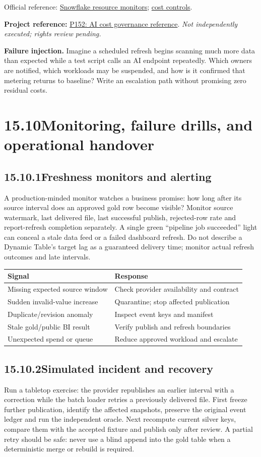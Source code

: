 \documentclass[11pt,twoside]{article}
\newcommand{\topic}[2]{\subsection*{#1\quad #2}}
\newcommand{\repo}[2]{\par\begingroup\fontsize{8.0}{9.6}\selectfont\sffamily\color{inkgray}\textbf{Project reference:} \href{#2}{#1}. \textit{Not independently executed; rights review pending.}\par\endgroup}
\begin{document}
{\fontsize{8}{9.5}\selectfont\color{inkgray}Official reference: \href{https://docs.snowflake.com/en/user-guide/resource-monitors}{Snowflake resource monitors}; \href{https://docs.snowflake.com/en/user-guide/cost-controlling}{cost controls}.}\par
\repo{P152: AI cost governance reference}{https://github.com/sfc-gh-sochandra/ai-cost-governance}
\textbf{Failure injection.} Imagine a scheduled refresh begins scanning much more data than expected while a test script calls an AI endpoint repeatedly. Which owners are notified, which workloads may be suspended, and how is it confirmed that metering returns to baseline? Write an escalation path without promising zero residual costs.

\newpage

\section*{15.10\quad Monitoring, failure drills, and operational handover}
\topic{15.10.1}{Freshness monitors and alerting}
A production-minded monitor watches a business promise: how long after its source interval does an approved gold row become visible? Monitor source watermark, last delivered file, last successful publish, rejected-row rate and report-refresh completion separately. A single green ``pipeline job succeeded'' light can conceal a stale data feed or a failed dashboard refresh. Do not describe a Dynamic Table's target lag as a guaranteed delivery time; monitor actual refresh outcomes and late intervals.
\begin{center}\small\begin{tabularx}{\linewidth}{@{}p{36mm}X@{}}\toprule
Signal & Response\\\midrule
Missing expected source window & Check provider availability and contract\\
Sudden invalid-value increase & Quarantine; stop affected publication\\
Duplicate/revision anomaly & Inspect event keys and manifest\\
Stale gold/public BI result & Verify publish and refresh boundaries\\
Unexpected spend or queue & Reduce approved workload and escalate\\\bottomrule\end{tabularx}\end{center}
\topic{15.10.2}{Simulated incident and recovery}
Run a tabletop exercise: the provider republishes an earlier interval with a correction while the batch loader retries a previously delivered file. First freeze further publication, identify the affected snapshots, preserve the original event ledger and run the independent oracle. Next recompute current silver keys, compare them with the accepted fixture and publish only after review. A partial retry should be safe: never use a blind append into the gold table when a deterministic merge or rebuild is required.
\end{document}
